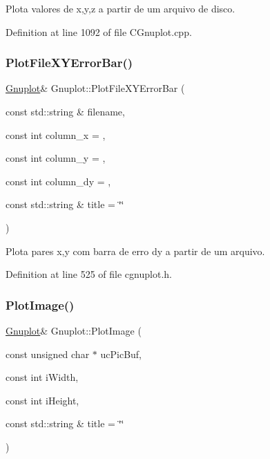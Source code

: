 Plota valores de x,y,z a partir de um arquivo de disco. 



Definition at line 1092 of file C\+Gnuplot.\+cpp.

\mbox{\label{class_gnuplot_a759edbd9404476415a4d6d5a286c360c}} 
\subsubsection{\texorpdfstring{Plot\+File\+X\+Y\+Error\+Bar()}{PlotFileXYErrorBar()}}
{\footnotesize\ttfamily \hyperlink{class_gnuplot}{Gnuplot}\& Gnuplot\+::\+Plot\+File\+X\+Y\+Error\+Bar (\begin{DoxyParamCaption}\item[{const std\+::string \&}]{filename,  }\item[{const int}]{column\+\_\+x = {},  }\item[{const int}]{column\+\_\+y = {},  }\item[{const int}]{column\+\_\+dy = {},  }\item[{const std\+::string \&}]{title = {\ttfamily \char`\"{}\char`\"{}} }\end{DoxyParamCaption})\hspace{0.3cm}{\ttfamily [inline]}}



Plota pares x,y com barra de erro dy a partir de um arquivo. 



Definition at line 525 of file cgnuplot.\+h.

\mbox{\label{class_gnuplot_aeb28a013344a81314bf831e14623154e}} 
\subsubsection{\texorpdfstring{Plot\+Image()}{PlotImage()}}
{\footnotesize\ttfamily \hyperlink{class_gnuplot}{Gnuplot}\& Gnuplot\+::\+Plot\+Image (\begin{DoxyParamCaption}\item[{const unsigned char $\ast$}]{uc\+Pic\+Buf,  }\item[{const int}]{i\+Width,  }\item[{const int}]{i\+Height,  }\item[{const std\+::string \&}]{title = {\ttfamily \char`\"{}\char`\"{}} }\end{DoxyParamCaption})\hspace{0.3cm}{\ttfamily [inline]}}




